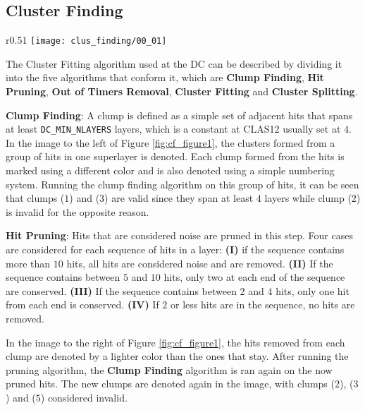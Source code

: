 \subsection{Cluster Finding} \label{ssec:framework_cf}
    \begin{wrapfigure}{r}{0.51\textwidth}
        \centering
        \texttt{[image: clus\_finding/00\_01]}
        \caption{\label{fig:cf_figure1} Clump Finding \& Hit Pruning algorithms over the layers in a superlayer.}
    \end{wrapfigure}

The Cluster Fitting algorithm used at the DC can be described by dividing it into the five algorithms that conform it, which are \textbf{Clump Finding}, \textbf{Hit Pruning}, \textbf{Out of Timers Removal}, \textbf{Cluster Fitting} and \textbf{Cluster Splitting}.

\textbf{Clump Finding}: A clump is defined as a simple set of adjacent hits that spans at least \texttt{DC\_MIN\_NLAYERS} layers, which is a constant at CLAS12 usually set at $4$.
In the image to the left of Figure \ref{fig:cf_figure1}, the clusters formed from a group of hits in one superlayer is denoted.
Each clump formed from the hits is marked using a different color and is also denoted using a simple numbering system.
Running the clump finding algorithm on this group of hits, it can be seen that clumps ($1$) and ($3$) are valid since they span at least $4$ layers while clump ($2$) is invalid for the opposite reason.

\textbf{Hit Pruning}: Hits that are considered noise are pruned in this step.
Four cases are considered for each sequence of hits in a layer: \textbf{(I)} if the sequence contains more than $10$ hits, all hits are considered noise and are removed.
\textbf{(II)} If the sequence contains between $5$ and $10$ hits, only two at each end of the sequence are conserved.
\textbf{(III)} If the sequence contains between $2$ and $4$ hits, only one hit from each end is conserved.
\textbf{(IV)} If $2$ or less hits are in the sequence, no hits are removed.

In the image to the right of Figure \ref{fig:cf_figure1}, the hits removed from each clump are denoted by a lighter color than the ones that stay.
After running the pruning algorithm, the \textbf{Clump Finding} algorithm is ran again on the now pruned hits.
The new clumps are denoted again in the image, with clumps ($2$), ($3$) and ($5$) considered invalid.

\newpage

